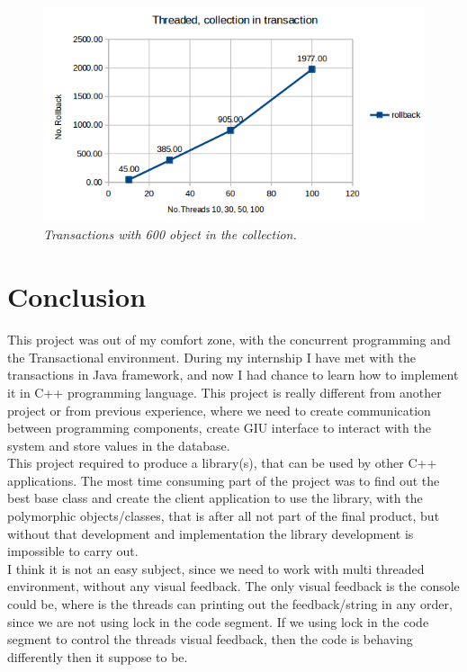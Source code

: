 \documentclass[12pt]{article}
\begin{document}
\begin{figure}[h!]
\centering
\includegraphics[scale=0.6]{Pictures/collection.png}
\caption*{\textit{\color{gray}Transactions with 600 object in the collection.}}
\end{figure}

\newpage
\section{Conclusion}
This project was out of my comfort zone, with the concurrent programming and the Transactional environment. During my internship I have met with the transactions in Java framework, and now I had chance to learn how to implement it in C++ programming language. This project is really different from another project or from previous experience, where we need to create communication between programming components, create GIU interface to interact with the system and store values in the database.\\

This project required to produce a library(s), that can be used by other C++ applications. The most time consuming part of the project was to find out the best base class and create the client application to use the library, with the polymorphic objects/classes, that is after all not part of the final product, but without that development and implementation the library development is impossible to carry out.\\

I think it is not an easy subject, since we need to work with multi threaded environment, without any visual feedback. The only visual feedback is the console could be, where is the threads can printing out the feedback/string in any order, since we are not using lock in the code segment. If we using lock in the code segment to control the threads visual feedback, then the code is behaving differently then it suppose to be.\\ 
\end{document}

